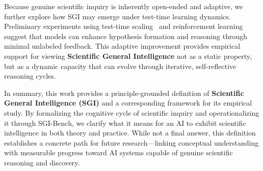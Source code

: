 Because genuine scientific inquiry is inherently open-ended and adaptive, we further explore how SGI may emerge under test-time learning dynamics. Preliminary experiments using test-time scaling~\cite{zhang2025survey} and reinforcement learning~\cite{zuo2025ttrl} suggest that models can enhance hypothesis formation and reasoning through minimal unlabeled feedback. This adaptive improvement provides empirical support for viewing \textbf{Scientific General Intelligence} not as a static property, but as a dynamic capacity that can evolve through iterative, self-reflective reasoning cycles.


In summary, this work provides a principle-grounded definition of \textbf{Scientific General Intelligence (SGI)} and a corresponding framework for its empirical study. By formalizing the cognitive cycle of scientific inquiry and operationalizing it through SGI-Bench, we clarify what it means for an AI to exhibit scientific intelligence in both theory and practice. While not a final answer, this definition establishes a concrete path for future research—linking conceptual understanding with measurable progress toward AI systems capable of genuine scientific reasoning and discovery.

